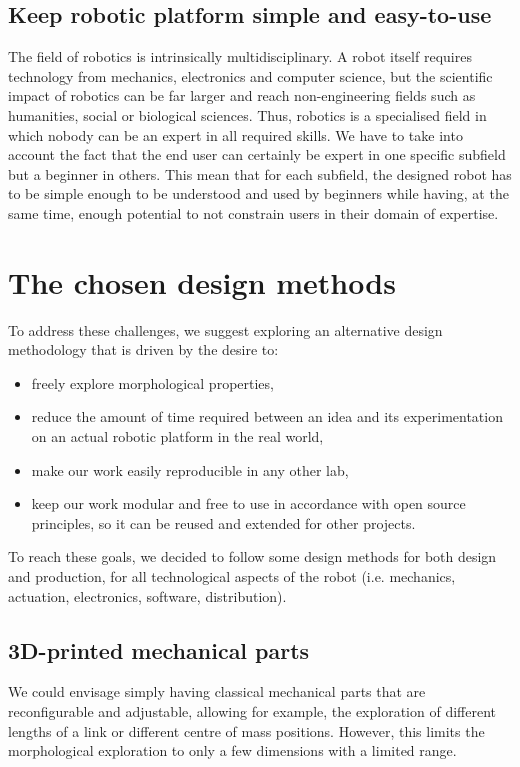 \subsection{Keep robotic platform simple and easy-to-use} %

The field of robotics is intrinsically multidisciplinary. A robot itself requires technology from mechanics, electronics and computer science, but the scientific impact of robotics can be far larger and reach non-engineering fields such as humanities, social or biological sciences. Thus, robotics is a specialised field  in which nobody can be an expert in all required skills.
We have to take into account the fact that the end user can certainly be expert in one specific subfield but a beginner in others. This mean that for each subfield, the designed robot has to be simple enough to be understood and used by beginners while having, at the same time, enough potential to not constrain users in their domain of expertise.



\section{The chosen design methods} %

To address these challenges, we suggest exploring an alternative design methodology that is driven by the desire to:
\begin{itemize}
    \item freely explore morphological properties,
    \item reduce the amount of time required between an idea and its experimentation on an actual robotic platform in the real world,
    \item make our work easily reproducible in any other lab,
    \item keep our work modular and free to use in accordance with open source principles, so it can be reused and extended for other projects.
\end{itemize}

To reach these goals, we decided to follow some design methods for both design and production, for all technological aspects of the robot (i.e. mechanics, actuation, electronics, software, distribution).

\subsection{3D-printed mechanical parts} %
We could envisage simply having classical mechanical parts that are reconfigurable and adjustable, allowing for example, the exploration of different lengths of a link or different centre of mass positions. However, this limits the morphological exploration to only a few dimensions with a limited range.

